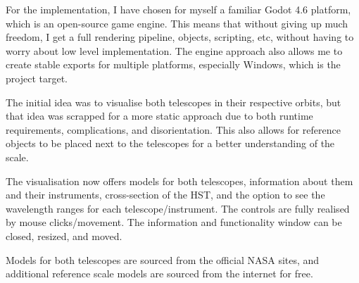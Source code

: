 For the implementation, I have chosen for myself a familiar Godot 4.6 platform, which is an open-source game engine. This means that without giving up much freedom, I get a full rendering pipeline, objects, scripting, etc, without having to worry about low level implementation. The engine approach also allows me to create stable exports for multiple platforms, especially Windows, which is the project target.

The initial idea was to visualise both telescopes in their respective orbits, but that idea was scrapped for a more static approach due to both runtime requirements, complications, and disorientation. This also allows for reference objects to be placed next to the telescopes for a better understanding of the scale.

The visualisation now offers models for both telescopes, information about them and their instruments, cross-section of the HST, and the option to see the wavelength ranges for each telescope/instrument. The controls are fully realised by mouse clicks/movement. The information and functionality window can be closed, resized, and moved.

Models for both telescopes are sourced from the official NASA sites, and additional reference scale models are sourced from the internet for free.